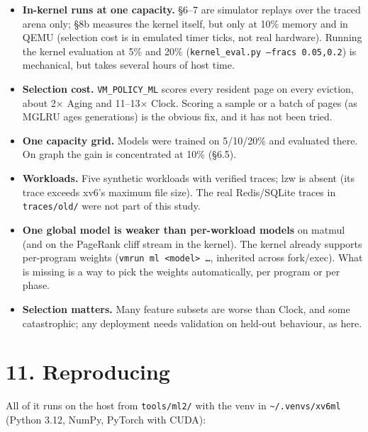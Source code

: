 \documentclass[10pt,a4paper]{article}
\newcommand{\code}[1]{\texttt{#1}}
\begin{document}
\begin{itemize}
\item \textbf{In-kernel runs at one capacity.} §6–7 are simulator replays over the traced arena only; §8b measures the kernel itself, but only at 10\% memory and in QEMU (selection cost is in emulated timer ticks, not real hardware). Running the kernel evaluation at 5\% and 20\% (\code{kernel\_\allowbreak{}eval.\allowbreak{}py --fracs 0.\allowbreak{}05,\allowbreak{}0.\allowbreak{}2}) is mechanical, but takes several hours of host time.
\item \textbf{Selection cost.} \code{VM\_\allowbreak{}POLICY\_\allowbreak{}ML} scores every resident page on every eviction, about 2× Aging and 11–13× Clock. Scoring a sample or a batch of pages (as MGLRU ages generations) is the obvious fix, and it has not been tried.
\item \textbf{One capacity grid.} Models were trained on 5/10/20\% and evaluated there. On graph the gain is concentrated at 10\% (§6.5).
\item \textbf{Workloads.} Five synthetic workloads with verified traces; lzw is absent (its trace exceeds xv6's maximum file size). The real Redis/SQLite traces in \code{traces/\allowbreak{}old/\allowbreak{}} were not part of this study.
\item \textbf{One global model is weaker than per-workload models} on matmul (and on the PageRank cliff stream in the kernel). The kernel already supports per-program weights (\code{vmrun ml <model> …}, inherited across fork/exec). What is missing is a way to pick the weights automatically, per program or per phase.
\item \textbf{Selection matters.} Many feature subsets are worse than Clock, and some catastrophic; any deployment needs validation on held-out behaviour, as here.
\end{itemize}

\section*{11. Reproducing}

All of it runs on the host from \code{tools/\allowbreak{}ml2/\allowbreak{}} with the venv in \code{\textasciitilde{}/\allowbreak{}.\allowbreak{}venvs/\allowbreak{}xv6ml} (Python 3.12, NumPy, PyTorch with CUDA):
\end{document}
